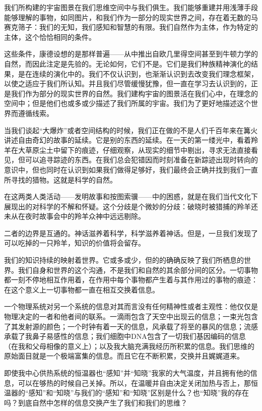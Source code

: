    我们所构建的宇宙图景在我们思维空间中与我们俱生。我们能够重建并用浅薄手段能够理解的事物，如同图片，和我们作为一部分的现实世界之间，存在着无数的马赛克筛子：我们的无知，我们感知和智慧的有限。我们自然作为主体，作为特定的主体，这个恰恰相同的条件。

   这些条件，康德设想的是那样普遍——从中推出自欧几里得空间甚至到牛顿力学的自然，而因此注定是先验的。无论如何，它们不是。它们是我们种族精神演化的结果，是在连续的演化中的。我们不仅认识到，也渐渐认识到去改变我们理念框架，以使之适应于我们所认知。并且我们尽管缓慢犹豫，但一直在学习去认识到的，正是我们作为部分的现实世界的自然。我们建构宇宙的图景活在我们心中，在理念的空间中；但是他们也或多或少描述了我们所属的宇宙。我们为了更好地描述这个世界而遵循线索。

   当我们谈起“大爆炸”或者空间结构的时候，我们正在做的不是人们千百年来在篝火讲述自由奇幻的故事的延续。它是别的东西的延续。在一天的第一缕光中，看着羚羊在大草原尘土中留下的痕迹，仔细观察，从现实的细节中剔出，寻求无法直接看见，但可以追寻踪迹的东西。在我们总会犯错因而时刻准备在新踪迹出现时转向的意识中，但也同时在认识到如果我们做得足够好，我们最终会正确并找到我们一直所寻找的猎物。这就是科学的自然。

   在这两类人类活动——发明故事和按图索骥——中的困惑，就是在我们当代文化下展现出的对科学的不解和怀疑。这个分歧是个微妙的分歧：破晓时被猎捕的羚羊还未从在夜时故事会中的羚羊众神中远远剔除。

   二者的边界是互通的。神话滋养着科学，科学滋养着神话。但是，一旦我们发现了可以吃掉的一只羚羊，知识的价值将会留存。

   我们的知识持续的映射着世界。它或多或少，但的的确确反映了我们所栖息的世界。我们自身和世界的这个沟通，不是我们和自然的其余部分间的区分。一切事物都一刻不停地相互作用着，在作用中每个事物都产生着与其作用过的事物的痕迹：在这个意义上一切事物都一直在相互交换着信息。

   一个物理系统对另一个系统的信息对其而言没有任何精神性或者主观性：他仅仅是物理决定的一者和他者间的联系。一滴雨包含了天空中出现云的信息；一束光包含了其发射源的颜色；一个时钟有着一天的信息，风承载了将至的暴风的信息；流感承载了我鼻子易感性的信息；我们细胞中DNA包含了一切我们基因编码的信息（在我和父母相像的意义上）；以及我大脑充满我经历所积累的信息。我们思维的原始面目就是一个极端富集的信息。而且它在不断积累，交换并且娓娓道来。

   即使我中心供热系统的恒温器也“感知”并“知晓”我家的大气温度，并且拥有他的信息，可以在够热的时候自己关掉。所以，在温暖并自由决定关闭加热与否上，那恒温器的“感知”和“知晓”与我们的“感知”和“知晓”区别是什么？也“知晓”我的存在吗？到底自然中怎样的信息交换产生了我们和我们的思维？

